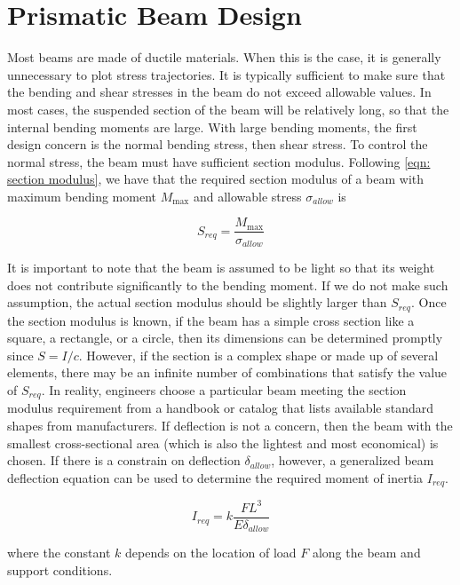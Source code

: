 \documentclass[
10pt,
a4paper,
openany,
svgnames,
]{book}
\begin{document}
\section{Prismatic Beam Design}

Most beams are made of ductile materials. When this is the case, it is generally unnecessary to plot stress trajectories. It is typically sufficient to make sure that the bending and shear stresses in the beam do not exceed allowable values. In most cases, the suspended section of the beam will be relatively long, so that the internal bending moments are large. With large bending moments, the first design concern is the normal bending stress, then shear stress. To control the normal stress, the beam must have sufficient section modulus. Following \cref{eqn: section modulus}, we have that the required section modulus of a beam with maximum bending moment $M_{\max}$ and allowable stress $\sigma_{allow}$ is

\begin{equation} \label{eqn: beam required section}
  S_{req} = \frac{M_{\max}}{\sigma_{allow}}
\end{equation}

It is important to note that the beam is assumed to be light so that its weight does not contribute significantly to the bending moment. If we do not make such assumption, the actual section modulus should be slightly larger than $S_{req}$. Once the section modulus is known, if the beam has a simple cross section like a square, a rectangle, or a circle, then its dimensions can be determined promptly since $S = I/c$. However, if the section is a complex shape or made up of several elements, there may be an infinite number of combinations that satisfy the value of $S_{req}$. In reality, engineers choose a particular beam meeting the section modulus requirement from a handbook or catalog that lists available standard shapes from manufacturers. If deflection is not a concern, then the beam with the smallest cross-sectional area (which is also the lightest and most economical) is chosen. If there is a constrain on deflection $\delta_{allow}$, however, a generalized beam deflection equation can be used to determine the required moment of inertia $I_{req}$.

\begin{equation}
  I_{req} = k \frac{FL^3}{E \delta_{allow}}
\end{equation}

where the constant $k$ depends on the location of load $F$ along the beam and support conditions.
  
\end{document}
